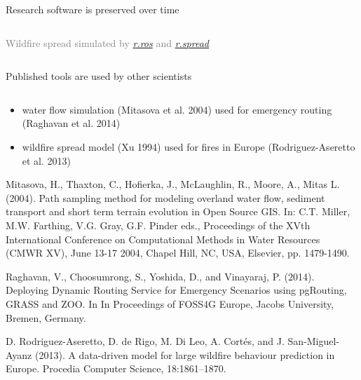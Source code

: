 \documentclass[xcolor={dvipsnames,usenames},beamer,aspectratio=169]{beamer}
\newcommand{\gmodule}[1]{\href{http://grass.osgeo.org/grass74/manuals/#1.html}{\emph{#1}}}
\begin{document}
\begin{frame}{Research software is preserved over time}
\begin{columns}
\begin{column}{0.5\textwidth}
\textcolor{gray}{
\footnotesize
Wildfire spread simulated by \gmodule{r.ros} and \gmodule{r.spread}
}

\end{column}
\end{columns}

\end{frame}


\begin{frame}{Published tools are used by other scientists}

\begin{columns}
\begin{column}{0.5\textwidth}

\begin{itemize}
  \item water flow simulation (Mitasova et al. 2004) used for emergency routing (Raghavan et al. 2014)
  \item wildfire spread model (Xu 1994) used
        for fires in Europe (Rodriguez-Aseretto et al. 2013)
\end{itemize}

\bigskip
\footnoterule
\tiny

Mitasova, H., Thaxton, C., Hofierka, J., McLaughlin, R., Moore, A., Mitas L. (2004). Path sampling method for modeling overland water flow, sediment transport and short term terrain evolution in Open Source GIS. In: C.T. Miller, M.W. Farthing, V.G. Gray, G.F. Pinder eds., Proceedings of the XVth International Conference on Computational Methods in Water Resources (CMWR XV), June 13-17 2004, Chapel Hill, NC, USA, Elsevier, pp. 1479-1490.

Raghavan, V., Choosumrong, S., Yoshida, D., and Vinayaraj, P. (2014). Deploying Dynamic Routing Service for Emergency Scenarios using pgRouting, GRASS and ZOO. In In Proceedings of FOSS4G Europe, Jacobs University, Bremen, Germany.

D. Rodriguez-Aseretto, D. de Rigo, M. Di Leo, A. Cortés, and J. San-Miguel-Ayanz (2013). A data-driven model for large wildfire behaviour prediction in Europe. Procedia Computer Science, 18:1861–1870.


\end{column}
\end{columns}
\end{frame}
\end{document}
